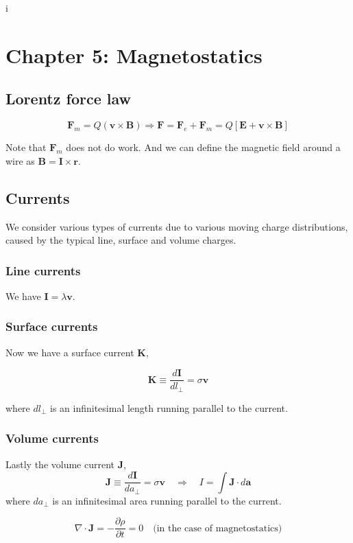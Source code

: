 i\documentclass[a4paper]{article}
\begin{document}
\section{Chapter 5: Magnetostatics}

\subsection{Lorentz force law}
\begin{equation}
    \bm{F}_{m}=Q(\bm{v}\times\bm{B})\Rightarrow \bm{F}=\bm{F}_{e}+\bm{F}_m=Q[\bm{E}+\bm{v}\times\bm{B}]
\end{equation}

Note that $\bm{F}_m$ does not do work. And we can define the magnetic field around a wire as $\bm{B}=\bm{I}\times\bm{r}$.

\subsection{Currents}
We consider various types of currents due to various moving charge distributions, caused by the typical line, surface and volume charges.
\subsubsection*{Line currents}
We have $\bm{I}=\lambda\bm{v}$.
\subsubsection*{Surface currents}
Now we have a surface current $\bm{K}$,

\begin{equation}
    \bm{K}\equiv \frac{d\bm{I}}{dl_{\perp}}=\sigma\bm{v}
\end{equation}

where $dl_{\perp}$ is an infinitesimal length running parallel to the current.
\subsubsection*{Volume currents}
Lastly the volume current $\bm{J}$,
\begin{equation}
    \bm{J}\equiv \frac{d\bm{I}}{da_{\perp}}=\sigma\bm{v}\quad\Rightarrow\quad I=\int \bm{J}\cdot d\bm{a} 
\end{equation}
where $da_{\perp}$ is an infinitesimal area running parallel to the current.

\begin{equation}
    \nabla\cdot \bm{J}=-\frac{\partial\rho}{\partial t}=0\quad \text{(in the case of magnetostatics)}
\end{equation}
\end{document}
